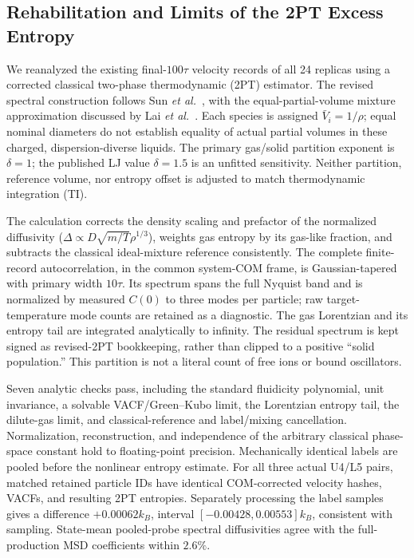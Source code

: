 \subsection{Rehabilitation and Limits of the 2PT Excess Entropy}
\label{sec:2pt_rehabilitation}

We reanalyzed the existing final-$100\tau$ velocity records of all 24 replicas using a corrected classical two-phase thermodynamic (2PT) estimator. The revised spectral construction follows Sun \emph{et al.}~\cite{Sun2017}, with the equal-partial-volume mixture approximation discussed by Lai \emph{et al.}~\cite{Lai2012}. Each species is assigned $\bar V_i=1/\rho$; equal nominal diameters do not establish equality of actual partial volumes in these charged, dispersion-diverse liquids. The primary gas/solid partition exponent is $\delta=1$; the published LJ value $\delta=1.5$ is an unfitted sensitivity. Neither partition, reference volume, nor entropy offset is adjusted to match thermodynamic integration (TI).

The calculation corrects the density scaling and prefactor of the normalized diffusivity ($\Delta\propto D\sqrt{m/T}\rho^{1/3}$), weights gas entropy by its gas-like fraction, and subtracts the classical ideal-mixture reference consistently. The complete finite-record autocorrelation, in the common system-COM frame, is Gaussian-tapered with primary width $10\tau$. Its spectrum spans the full Nyquist band and is normalized by measured $C(0)$ to three modes per particle; raw target-temperature mode counts are retained as a diagnostic. The gas Lorentzian and its entropy tail are integrated analytically to infinity. The residual spectrum is kept signed as revised-2PT bookkeeping, rather than clipped to a positive ``solid population.'' This partition is not a literal count of free ions or bound oscillators.

Seven analytic checks pass, including the standard fluidicity polynomial, unit invariance, a solvable VACF/Green--Kubo limit, the Lorentzian entropy tail, the dilute-gas limit, and classical-reference and label/mixing cancellation. Normalization, reconstruction, and independence of the arbitrary classical phase-space constant hold to floating-point precision. Mechanically identical labels are pooled before the nonlinear entropy estimate. For all three actual U4/L5 pairs, matched retained particle IDs have identical COM-corrected velocity hashes, VACFs, and resulting 2PT entropies. Separately processing the label samples gives a difference $+0.00062k_B$, interval $[-0.00428,0.00553]k_B$, consistent with sampling. State-mean pooled-probe spectral diffusivities agree with the full-production MSD coefficients within $2.6\%$.

